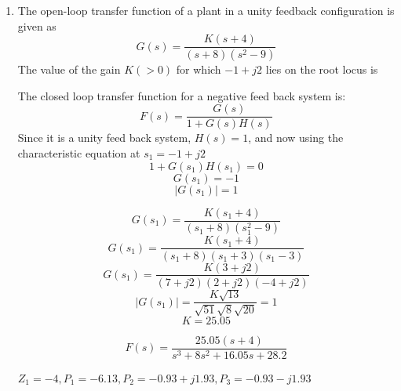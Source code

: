 \begin{enumerate}[label=\thesection.\arabic*.,ref=\thesection.\theenumi]

\item
 The open-loop transfer function of a plant in a unity feedback configuration is given as 
\begin{equation}
    G(s) = \dfrac{K(s+4)}{(s+8)(s^{2}-9)}
\end{equation}
 The value of the gain $K(>0)$ for which $-1 + j2$ lies on the root locus is
    
  

\solution
  The closed loop transfer function for a negative feed back system is:
  \begin{equation}
      F(s) = \dfrac{G(s)}{1+G(s)H(s)}
  \end{equation}
Since it is a unity feed back system, $H(s) = 1$, and now using the characteristic equation at $s_{1} = -1 + j2$
\begin{equation}
1 + G(s_{1})H(s_{1}) = 0
\end{equation}
\begin{equation}
 G(s_{1}) = -1
\end{equation}
\begin{equation}
 |G(s_{1})| = 1
\end{equation}


\begin{equation}
    G(s_{1}) = \dfrac{K(s_{1}+4)}{(s_{1}+8)(s_{1}^{2}-9)}
\end{equation}
\begin{equation}
    G(s_{1}) = \dfrac{K(s_{1}+4)}{(s_{1}+8)(s_{1}+3)(s_{1}-3)}
\end{equation}
\begin{equation}
    G(s_{1}) = \dfrac{K(3+j2)}{(7+j2)(2+j2)(-4+j2)}
\end{equation}
\begin{equation}
    |G(s_{1})| = \dfrac{K\sqrt{13}}{\sqrt{51}\sqrt{8}\sqrt{20}} = 1
\end{equation}
\begin{equation}
    K = 25.05
\end{equation}


\begin{equation}
    F(s) = \dfrac{25.05(s+4)}{s^{3}+8s^{2}+16.05s+28.2}
\end{equation}

    $Z_{1}=-4, P_{1}=-6.13, P_{2}=-0.93+j1.93, P_{3}=-0.93-j1.93$



\end{enumerate}
